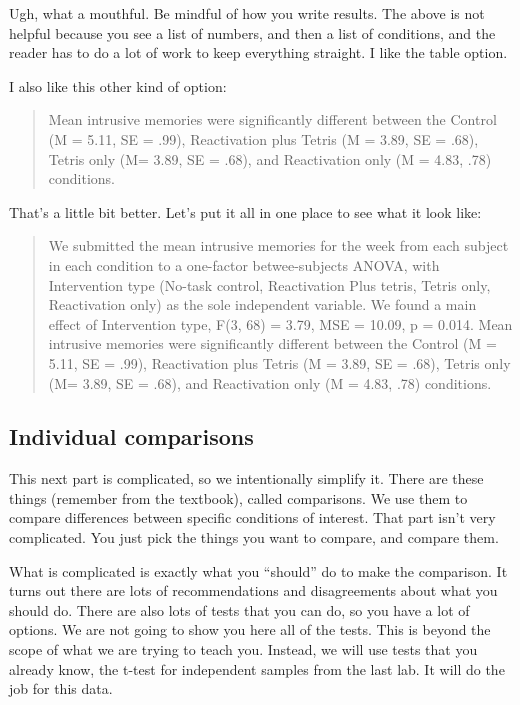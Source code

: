 \documentclass[]{book}
\begin{document}
Ugh, what a mouthful. Be mindful of how you write results. The above is
not helpful because you see a list of numbers, and then a list of
conditions, and the reader has to do a lot of work to keep everything
straight. I like the table option.

I also like this other kind of option:

\begin{quote}
Mean intrusive memories were significantly different between the Control
(M = 5.11, SE = .99), Reactivation plus Tetris (M = 3.89, SE = .68),
Tetris only (M= 3.89, SE = .68), and Reactivation only (M = 4.83, .78)
conditions.
\end{quote}

That's a little bit better. Let's put it all in one place to see what it
look like:

\begin{quote}
We submitted the mean intrusive memories for the week from each subject
in each condition to a one-factor betwee-subjects ANOVA, with
Intervention type (No-task control, Reactivation Plus tetris, Tetris
only, Reactivation only) as the sole independent variable. We found a
main effect of Intervention type, F(3, 68) = 3.79, MSE = 10.09, p =
0.014. Mean intrusive memories were significantly different between the
Control (M = 5.11, SE = .99), Reactivation plus Tetris (M = 3.89, SE =
.68), Tetris only (M= 3.89, SE = .68), and Reactivation only (M = 4.83,
.78) conditions.
\end{quote}

\subsection{Individual comparisons}\label{individual-comparisons}

This next part is complicated, so we intentionally simplify it. There
are these things (remember from the textbook), called comparisons. We
use them to compare differences between specific conditions of interest.
That part isn't very complicated. You just pick the things you want to
compare, and compare them.

What is complicated is exactly what you ``should'' do to make the
comparison. It turns out there are lots of recommendations and
disagreements about what you should do. There are also lots of tests
that you can do, so you have a lot of options. We are not going to show
you here all of the tests. This is beyond the scope of what we are
trying to teach you. Instead, we will use tests that you already know,
the t-test for independent samples from the last lab. It will do the job
for this data.
\end{document}
